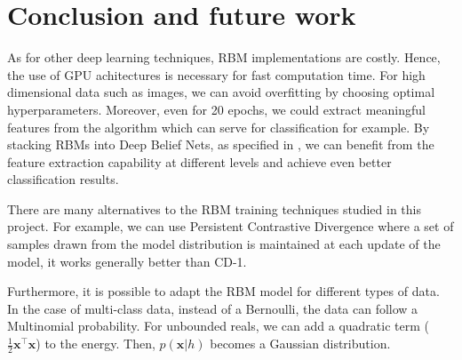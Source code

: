 \documentclass{article}
\begin{document}
\section{Conclusion and future work}

As for other deep learning techniques, RBM implementations are costly. Hence, the use of GPU achitectures is necessary for fast computation time. For high dimensional data such as images, we can avoid overfitting by choosing optimal hyperparameters. Moreover, even for 20 epochs, we could extract meaningful features from the algorithm which can serve for classification for example. By stacking RBMs into Deep Belief Nets, as specified in \cite{hinton2006fast}, we can benefit from the feature extraction capability at different levels and achieve even better classification results.

There are many alternatives to the RBM training techniques studied in this project. For example, we can use Persistent Contrastive Divergence \cite{hinton2010practical} where a set of samples drawn from the model distribution is maintained at each update of the model, it works generally better than CD-1.

Furthermore, it is possible to adapt the RBM model for different types of data. In the case of multi-class data, instead of a Bernoulli, the data can follow a Multinomial probability. For unbounded reals, we can add a quadratic term ($\frac{1}{2}\mathbf{x}^\top \mathbf{x}$) to the energy. Then, $p(\mathbf{x}|h)$ becomes a Gaussian distribution.%


\clearpage
\nocite{*}


\end{document}
